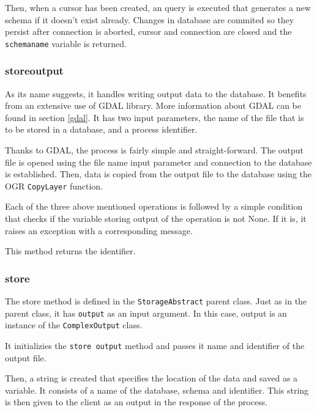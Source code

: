 Then, when a cursor has been created, an  query is executed
that generates a new schema if it doesn't exist already. Changes in database are
commited so they persist after connection is aborted, cursor and
connection are closed and the \texttt{schema\textunderscore name}
variable is returned.

\subsubsection{\textunderscore store\textunderscore output}

As its name suggests, it handles writing output data to the
database. It benefits from an extensive use of GDAL library. More
information about GDAL can be found in section \ref{gdal}. It has
two input parameters, the name of the file that is to be stored in a
database, and a process identifier.

Thanks to GDAL, the process is fairly simple and straight-forward. The
output file is opened using the file name input parameter and
connection to the database is established. Then, data is copied from
the output file to the database using the OGR \texttt{CopyLayer}
function.

Each of the three above mentioned operations is followed by a simple
condition that checks if the variable storing output of the operation
is not None. If it is, it raises an exception with a corresponding
message.

This method returns the identifier.


\subsubsection{store} 

The store method is defined in the \texttt{StorageAbstract} parent
class. Just as in the parent class, it has \texttt{output} as an input
argument. In this case, output is an instance of the \texttt{ComplexOutput} class.

It initializies the \texttt{\textunderscore store\textunderscore
  output} method and passes it name and identifier of the output file.

Then, a string is created that specifies the location of the data and
saved as a variable. It consists of a name of the database, schema and
identifier. This string is then given to the client as an output in
the  response of the process.

